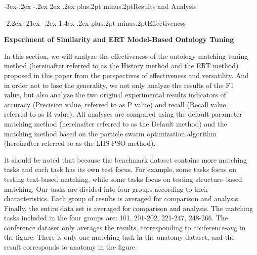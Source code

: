 \documentclass[twoside]{article}
\makeatletter
\def\subsection{\@startsection{subsection}{2}{\z@}%
 {-3ex\@plus -.2ex \@minus -.2ex}%
 {2ex \@plus.2ex}%
{\normalfont\normalsize\protect\baselineskip=12.5pt plus.2pt minus.2pt\bfseries}}
\def\subsubsection{\@startsection{subsubsection}{3}{\z@}%
 {-2.2ex\@plus -.21ex \@minus -.2ex}%
 {1.4ex \@plus.2ex}
{\normalfont\normalsize\protect\baselineskip=12pt plus.2pt minus.2pt\sl}}
\makeatother
\begin{document}
\subsection{Results and Analysis}




\subsubsection{Effectiveness}

{\bf Experiment of Similarity and ERT Model-Based Ontology Tuning}

In this section, we will analyze the effectiveness of the ontology matching tuning method (hereinafter referred to as the History method and the ERT method) proposed in this paper from the perspectives of effectiveness and versatility.
And in order not to lose the generality, we not only analyze the results of the F1 value, but also analyze the two original experimental results indicators of accuracy (Precision value, referred to as P value) and recall (Recall value, referred to as R value).
All analyses are compared using the default parameter matching method (hereinafter referred to as the Default method) and the matching method based on the particle swarm optimization algorithm (hereinafter referred to as the LHS-PSO method).

It should be noted that because the benchmark dataset contains more matching tasks and each task has its own test focus.
For example, some tasks focus on testing text-based matching, while some tasks focus on testing structure-based matching.
Our tasks are divided into four groups according to their characteristics.
Each group of results is averaged for comparison and analysis.
Finally, the entire data set is averaged for comparison and analysis.
The matching tasks included in the four groups are: 101, 201-202, 221-247, 248-266.
The conference dataset only averages the results, corresponding to conference-avg in the figure.
There is only one matching task in the anatomy dataset, and the result corresponds to anatomy in the figure.
\end{document}
